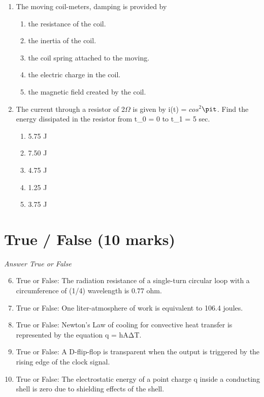 \documentclass[12pt]{article}
\begin{document}
\begin{enumerate}[label=\arabic*.]
\begin{enumerate}[label=(\alph*)]
    \item 20 hp
    \item 10 hp
    \item 35 hp
    \item 5 hp
\end{enumerate}
\item The moving coil-meters, damping is provided by
\begin{enumerate}[label=(\alph*)]
    \item the resistance of the coil.
    \item the inertia of the coil.
    \item the coil spring attached to the moving.
    \item the electric charge in the coil.
    \item the magnetic field created by the coil.
\end{enumerate}
\item The current through a resistor of 2\ensuremath{\Omega} is given by i(t) = $cos^2$\ensuremath{\pit}. Find the energy dissipated in the resistor from t\_0 = 0 to t\_1 = 5 sec.
\begin{enumerate}[label=(\alph*)]
    \item 5.75 J
    \item 7.50 J
    \item 4.75 J
    \item 1.25 J
    \item 3.75 J
\end{enumerate}
\end{enumerate}

\section*{True / False (10 marks)}
\textit{Answer True or False}
\begin{enumerate}[label=\arabic*.]
\setcounter{enumi}{5}
\item True or False: The radiation resistance of a single-turn circular loop with a circumference of (1/4) wavelength is 0.77 ohm.
\item True or False: One liter-atmosphere of work is equivalent to 106.4 joules.
\item True or False: Newton's Law of cooling for convective heat transfer is represented by the equation q = hAΔT.
\item True or False: A D-flip-flop is transparent when the output is triggered by the rising edge of the clock signal.
\item True or False: The electrostatic energy of a point charge q inside a conducting shell is zero due to shielding effects of the shell.
\end{enumerate}
\end{document}
